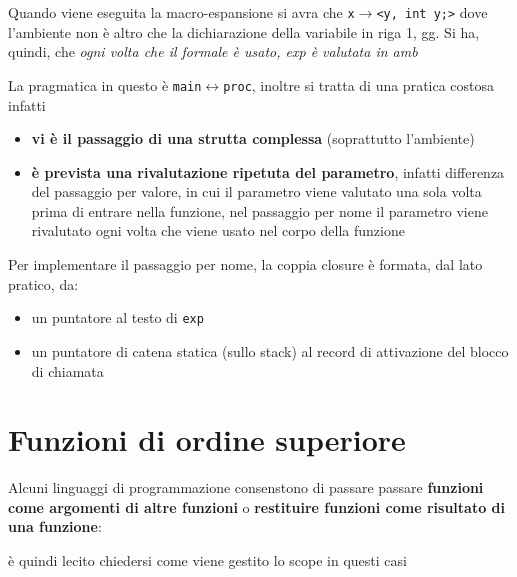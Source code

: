 Quando viene eseguita la macro-espansione si avra che \texttt{x$\to$<y, int y;>} dove l'ambiente non è altro che la dichiarazione della variabile in riga 1, gg. Si ha, quindi, che \textit{ogni volta che il formale è usato, exp è valutata in amb}

La pragmatica in questo è \texttt{main$\leftrightarrow$proc}, inoltre si tratta di una pratica costosa infatti

\begin{itemize}
    \item \textbf{vi è il passaggio di una strutta complessa} (soprattutto l'ambiente)
    \item \textbf{è prevista una rivalutazione ripetuta del parametro}, infatti differenza del passaggio per valore, in cui il parametro viene valutato una sola volta prima di entrare nella funzione, nel passaggio per nome il parametro viene rivalutato ogni volta che viene usato nel corpo della funzione
\end{itemize}

Per implementare il passaggio per nome, la coppia closure è formata, dal lato pratico, da:
\begin{itemize}
    \item un puntatore al testo di \texttt{exp}
    \item un puntatore di catena statica (sullo stack) al record di attivazione del blocco di chiamata
\end{itemize}
\section{Funzioni di ordine superiore}
Alcuni linguaggi di programmazione consenstono di passare passare \textbf{funzioni come argomenti di altre funzioni} o  \textbf{restituire funzioni come risultato di una funzione}:

è quindi lecito chiedersi come viene gestito lo scope in questi casi

